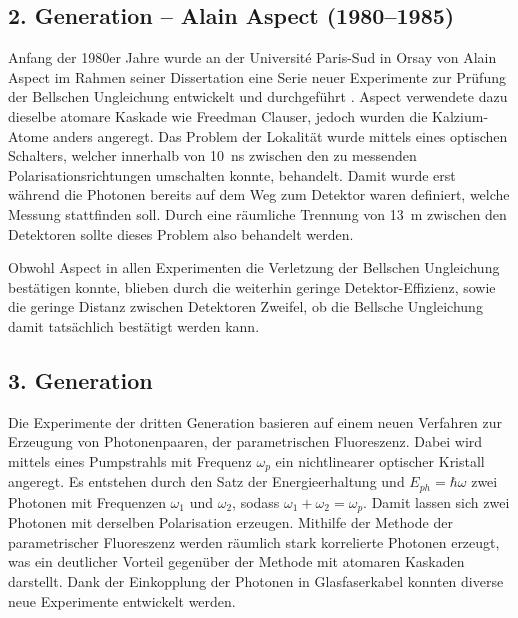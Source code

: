\begin{refsection}
\subsection{2. Generation -- Alain Aspect (1980--1985)}
Anfang der 1980er Jahre wurde an der Universit\'e Paris-Sud in Orsay von Alain
Aspect im Rahmen seiner Dissertation eine Serie neuer Experimente zur Pr\"ufung
der Bellschen Ungleichung entwickelt und durchgef\"uhrt
\cite{Bell:Aspect1981,Bell:Aspect1982:1,Bell:Aspect1982:2}. 
Aspect verwendete dazu dieselbe atomare Kaskade wie Freedman Clauser, jedoch
wurden die Kalzium-Atome anders angeregt. 
Das Problem der Lokalit\"at wurde mittels eines optischen Schalters, welcher 
innerhalb von \SI{10}{\nano\second} zwischen den zu messenden 
Polarisationsrichtungen umschalten konnte, behandelt.
Damit wurde erst w\"ahrend die Photonen bereits auf dem Weg zum Detektor waren
definiert, welche Messung stattfinden soll.
Durch eine r\"aumliche Trennung von \SI{13}{\meter} zwischen den Detektoren
sollte dieses Problem also behandelt werden. 

Obwohl Aspect in allen Experimenten die Verletzung der Bellschen Ungleichung
best\"atigen konnte, blieben durch die weiterhin geringe Detektor-Effizienz,
sowie die geringe Distanz zwischen Detektoren Zweifel, ob die Bellsche
Ungleichung damit tats\"achlich best\"atigt werden kann.

\subsection{3. Generation}
Die Experimente der dritten Generation basieren auf einem neuen Verfahren
zur Erzeugung von Photonenpaaren, der parametrischen Fluoreszenz.
Dabei wird mittels eines Pumpstrahls mit Frequenz $\omega_p$ ein
nichtlinearer optischer Kristall angeregt.
Es entstehen durch den Satz der Energieerhaltung und $E_{ph}=\hbar \omega$
zwei Photonen mit Frequenzen $\omega_1$ und $\omega_2$, sodass 
$\omega_1 + \omega_2 = \omega_p$.
Damit lassen sich zwei Photonen mit derselben Polarisation erzeugen.
Mithilfe der Methode der parametrischer Fluoreszenz werden r\"aumlich
stark korrelierte Photonen erzeugt, was ein deutlicher Vorteil
gegen\"uber der Methode mit atomaren Kaskaden darstellt.
Dank der Einkopplung der Photonen in Glasfaserkabel konnten diverse neue
Experimente entwickelt werden.


\end{refsection}
